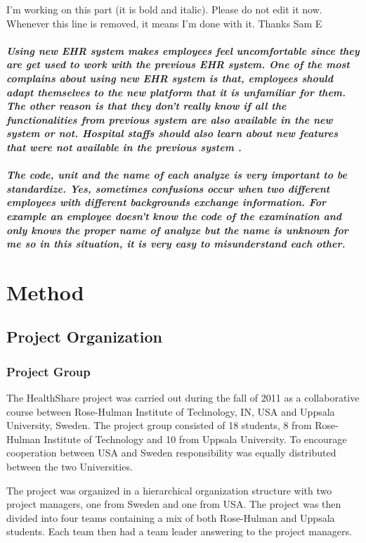 \documentclass[14pt]{article}
\begin{document}
\begin{description}
{\LARGE I'm working on this part (it is bold and italic). Please do not edit it now. Whenever this line is removed, it means I'm done with it. Thanks Sam E}
\textbf{\emph{
\\
\\
Using new \gls{EHR} system makes employees feel uncomfortable since they are get used to work with the previous \gls{EHR} system. One of the most complains about using new \gls{EHR} system is that, employees should adapt themselves to the new platform that it is unfamiliar for them. The other reason is that they don’t really know if all the functionalities from previous system are also available in the new system or not. Hospital staffs should also learn about new features that were not available in the previous system \cite{FarzinYazdi}.
\\
\\
The code, unit and the name of each analyze is very important to be standardize.
Yes, sometimes confusions occur when two different employees with different backgrounds exchange information. For example an employee doesn't know the code of the examination and only knows the proper name of analyze but the name is unknown for me so in this situation, it is very easy to misunderstand each other.
}}
\end{description}

\newpage

\section{Method}
\label{sec:Method}

\subsection{Project Organization}
\subsubsection{Project Group}
The HealthShare project was carried out during the fall of 2011 as a collaborative course between Rose-Hulman Institute of Technology, IN, USA and Uppsala University, Sweden.
The project group consisted of 18 students, 8 from Rose-Hulman Institute of Technology and 10 from Uppsala University. To encourage cooperation between USA and Sweden responsibility was equally distributed between the two Universities.

The project was organized in a hierarchical organization structure with two project managers, one from Sweden and one from USA. The project was then divided into four teams containing a mix of both Rose-Hulman and Uppsala students. Each team then had a team leader answering to the project managers.
\end{document}
